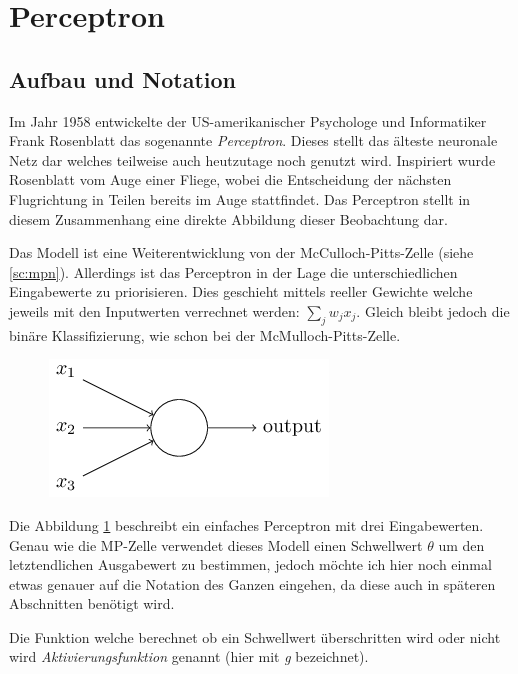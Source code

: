 \section{Perceptron} \label{sc:per}

\subsection{Aufbau und Notation}

Im Jahr 1958 entwickelte der US-amerikanischer Psychologe und Informatiker Frank Rosenblatt das sogenannte \emph{Perceptron}. Dieses stellt das älteste neuronale Netz dar welches teilweise auch heutzutage noch genutzt wird. Inspiriert wurde Rosenblatt vom Auge einer Fliege, wobei die Entscheidung der nächsten Flugrichtung in Teilen bereits im Auge stattfindet. Das Perceptron stellt in diesem Zusammenhang eine direkte Abbildung dieser Beobachtung dar.

Das Modell ist eine Weiterentwicklung von der McCulloch-Pitts-Zelle (siehe \autoref{sc:mpn}). Allerdings ist das Perceptron in der Lage die unterschiedlichen Eingabewerte zu priorisieren. Dies geschieht mittels reeller Gewichte welche jeweils mit den Inputwerten verrechnet werden: $\sum_j w_j x_j$. Gleich bleibt jedoch die binäre Klassifizierung, wie schon bei der McMulloch-Pitts-Zelle.

\begin{figure}[!htb]
	\centering
	\includegraphics[width=.5\linewidth]{./img/erstesPerceptron}
	\label{fig:erstesPerceptron}
\end{figure}

Die Abbildung \ref{fig:erstesPerceptron} beschreibt ein einfaches Perceptron mit drei Eingabewerten. Genau wie die MP-Zelle verwendet dieses Modell einen Schwellwert $\theta$ um den letztendlichen Ausgabewert zu bestimmen, jedoch möchte ich hier noch einmal etwas genauer auf die Notation des Ganzen eingehen, da diese auch in späteren Abschnitten benötigt wird.

Die Funktion welche berechnet ob ein Schwellwert überschritten wird oder nicht wird \emph{Aktivierungsfunktion} genannt (hier mit \emph{g} bezeichnet).

